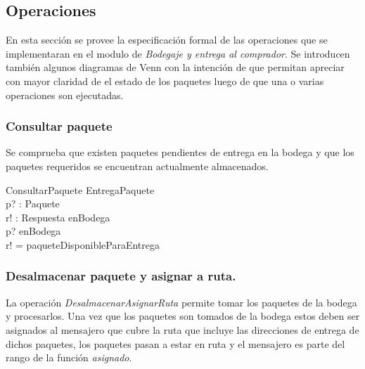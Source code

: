 \documentclass[12pt,a4paper]{article}
\begin{document}
\subsection{Operaciones}

En esta sección se provee la especificación formal de las operaciones que se implementaran en el modulo de \textit{Bodegaje y entrega al comprador}. Se introducen también algunos diagramas de Venn con la intención de que permitan apreciar con mayor claridad de el estado de los paquetes luego de que una o varias operaciones son ejecutadas.

\subsubsection{Consultar paquete}

Se comprueba que existen paquetes pendientes de entrega en la bodega y que los paquetes requeridos se encuentran actualmente almacenados.

\begin{schema}{ConsultarPaquete}
\Xi EntregaPaquete\\
p? : Paquete\\
r! : Respuesta
\where
enBodega \neq \emptyset\\
p? \in enBodega\\
r! = paqueteDisponibleParaEntrega
\end{schema}

\subsubsection{Desalmacenar paquete y asignar a ruta.}

La operación \textit{DesalmacenarAsignarRuta} permite tomar los paquetes de la bodega y procesarlos. Una vez que los paquetes son tomados de la bodega estos deben ser asignados al mensajero que cubre la ruta que incluye las direcciones de entrega de dichos paquetes, los paquetes pasan a estar en ruta y el mensajero es parte del rango de la función \textit{asignado}.
\end{document}
